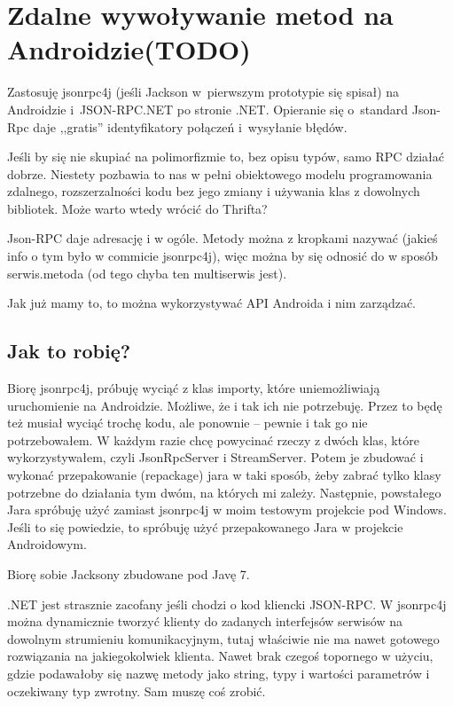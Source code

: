 \section{Zdalne wywoływanie metod na Androidzie(TODO)}
Zastosuję jsonrpc4j (jeśli Jackson w~pierwszym prototypie się spisał) na Androidzie i~JSON-RPC.NET po stronie .NET\@.
Opieranie się o~standard Json-Rpc daje ,,gratis'' identyfikatory połączeń i~wysyłanie błędów.

Jeśli by się nie skupiać na polimorfizmie to, bez opisu typów, samo RPC działać dobrze. Niestety pozbawia to nas w pełni obiektowego modelu programowania zdalnego, rozszerzalności kodu bez jego zmiany i używania klas z dowolnych bibliotek. Może warto wtedy wrócić do Thrifta?

Json-RPC daje adresację i w ogóle. Metody można z kropkami nazywać (jakieś info o tym było w commicie jsonrpc4j), więc można by się odnosić do w sposób serwis.metoda (od tego chyba ten multiserwis jest).

Jak już mamy to, to można wykorzystywać API Androida i nim zarządzać.

\subsection{Jak to robię?}
Biorę jsonrpc4j, próbuję wyciąć z klas importy, które uniemożliwiają uruchomienie na Androidzie. Możliwe, że i tak ich nie potrzebuję. Przez to będę też musiał wyciąć trochę kodu, ale ponownie -- pewnie i tak go nie potrzebowałem.
W każdym razie chcę powycinać rzeczy z dwóch klas, które wykorzystywałem, czyli JsonRpcServer i StreamServer. Potem je zbudować i wykonać przepakowanie (repackage) jara w taki sposób, żeby zabrać tylko klasy potrzebne do działania tym dwóm, na których mi zależy. Następnie, powstałego Jara spróbuję użyć zamiast jsonrpc4j w moim testowym projekcie pod Windows. Jeśli to się powiedzie, to spróbuję użyć przepakowanego Jara w projekcie Androidowym.

Biorę sobie Jacksony zbudowane pod Javę 7.

.NET jest strasznie zacofany jeśli chodzi o kod kliencki JSON-RPC. W jsonrpc4j można dynamicznie tworzyć klienty do zadanych interfejsów serwisów na dowolnym strumieniu komunikacyjnym, tutaj właściwie nie ma nawet gotowego rozwiązania na jakiegokolwiek klienta. Nawet brak czegoś topornego w użyciu, gdzie podawałoby się nazwę metody jako string, typy i wartości parametrów i oczekiwany typ zwrotny.
Sam muszę coś zrobić.

